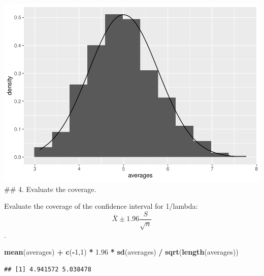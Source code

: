 \documentclass[]{article}
\newenvironment{Shaded}{\begin{snugshade}}{\end{snugshade}}
\newcommand{\DecValTok}[1]{\textcolor[rgb]{0.00,0.00,0.81}{#1}}
\newcommand{\FloatTok}[1]{\textcolor[rgb]{0.00,0.00,0.81}{#1}}
\newcommand{\KeywordTok}[1]{\textcolor[rgb]{0.13,0.29,0.53}{\textbf{#1}}}
\newcommand{\NormalTok}[1]{#1}
\newcommand{\OperatorTok}[1]{\textcolor[rgb]{0.81,0.36,0.00}{\textbf{#1}}}
\newcommand{\StringTok}[1]{\textcolor[rgb]{0.31,0.60,0.02}{#1}}
\begin{document}
\includegraphics{Part1_files/figure-latex/unnamed-chunk-4-1.pdf} \#\# 4.
Evaluate the coverage.

Evaluate the coverage of the confidence interval for 1/lambda:
\[ \bar{X} \pm 1.96\frac{S}{\sqrt{n}}\].

\begin{Shaded}
\begin{Highlighting}[]
\KeywordTok{mean}\NormalTok{(averages) }\OperatorTok{+}\StringTok{ }\KeywordTok{c}\NormalTok{(}\OperatorTok{-}\DecValTok{1}\NormalTok{,}\DecValTok{1}\NormalTok{) }\OperatorTok{*}\StringTok{ }\FloatTok{1.96} \OperatorTok{*}\StringTok{ }\KeywordTok{sd}\NormalTok{(averages) }\OperatorTok{/}\StringTok{ }\KeywordTok{sqrt}\NormalTok{(}\KeywordTok{length}\NormalTok{(averages))}
\end{Highlighting}
\end{Shaded}

\begin{verbatim}
## [1] 4.941572 5.038478
\end{verbatim}
\end{document}
